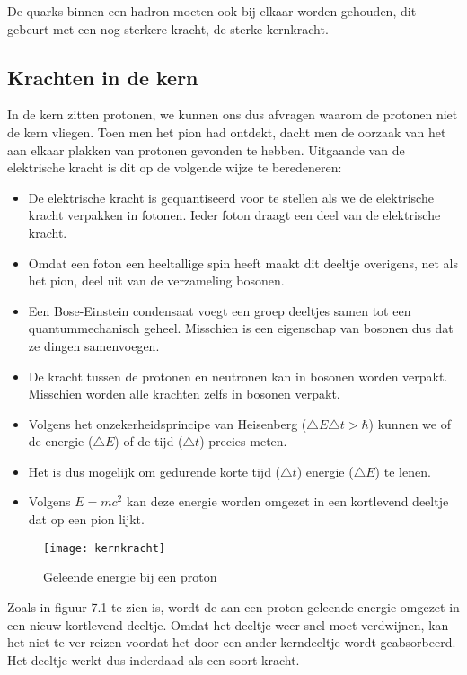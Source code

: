 De quarks binnen een hadron moeten ook bij elkaar worden gehouden,
dit gebeurt met een nog sterkere kracht, de sterke kernkracht. 


\subsection{Krachten in de kern}

In de kern zitten protonen, we kunnen ons dus afvragen waarom de protonen
niet de kern vliegen. Toen men het pion had ontdekt, dacht men de
oorzaak van het aan elkaar plakken van protonen gevonden te hebben.
Uitgaande van de elektrische kracht is dit op de volgende wijze te
beredeneren:
\begin{itemize}
\item De elektrische kracht is gequantiseerd voor te stellen als we de elektrische
kracht verpakken in fotonen. Ieder foton draagt een deel van de elektrische
kracht. 
\item Omdat een foton een heeltallige spin heeft maakt dit deeltje overigens,
net als het pion, deel uit van de verzameling bosonen.
\item Een Bose-Einstein condensaat voegt een groep deeltjes samen tot een
quantummechanisch geheel. Misschien is een eigenschap van bosonen
dus dat ze dingen samenvoegen. 
\item De kracht tussen de protonen en neutronen kan in bosonen worden verpakt.
Misschien worden alle krachten zelfs in bosonen verpakt. 
\item Volgens het onzekerheidsprincipe van Heisenberg ($\triangle E\triangle t>\hbar$)
kunnen we of de energie ($\triangle E$) of de tijd ($\triangle t$)
precies meten.
\item Het is dus mogelijk om gedurende korte tijd ($\triangle t$) energie
($\triangle E$) te lenen.
\item Volgens $E=mc^{2}$ kan deze energie worden omgezet in een kortlevend
deeltje dat op een pion lijkt.
\end{itemize}
\begin{figure}[h]
\noindent \begin{centering}
\texttt{[image: kernkracht]}
\par\end{centering}

\caption{Geleende energie bij een proton}
\end{figure}


Zoals in figuur 7.1 te zien is, wordt de aan een proton geleende energie
omgezet in een nieuw kortlevend deeltje. Omdat het deeltje weer snel
moet verdwijnen, kan het niet te ver reizen voordat het door een ander
kerndeeltje wordt geabsorbeerd. Het deeltje werkt dus inderdaad als
een soort kracht. 

